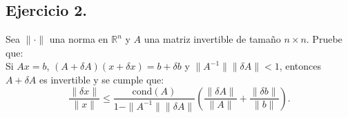
\subsection*{Ejercicio 2.}
Sea $\| \cdot \|$ una norma en $\mathbb{R}^n$ y $A$ una matriz invertible de tamaño $n \times n$. Pruebe que:\\

Si $Ax = b$, $(A + \delta A)(x + \delta x) = b + \delta b$ y $\|A^{-1}\| \|\delta A\| < 1$, entonces $A + \delta A$ es invertible y se cumple que:
\[
\frac{\|\delta x\|}{\|x\|} \leq \frac{\text{cond}(A)}{1 - \|A^{-1}\| \|\delta A\|} \left( \frac{\|\delta A\|}{\|A\|} + \frac{\|\delta b\|}{\|b\|} \right).
\]